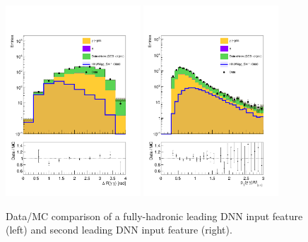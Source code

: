 \begin{figure}[!htbp]
  \centering
  \includegraphics[width=0.45\textwidth]{Images/DataMC/DataMC_New_DR_gg_SB_log.pdf}%
  \includegraphics[width=0.45\textwidth]{Images/DataMC/DataMC_Scaled_Leading_Photon_pt_SB_log.pdf}%
  \caption{Data/MC comparison of a fully-hadronic leading DNN input feature (left) and second leading DNN input feature (right).}
\label{fig:FH_DataMC_1}
\end{figure}

